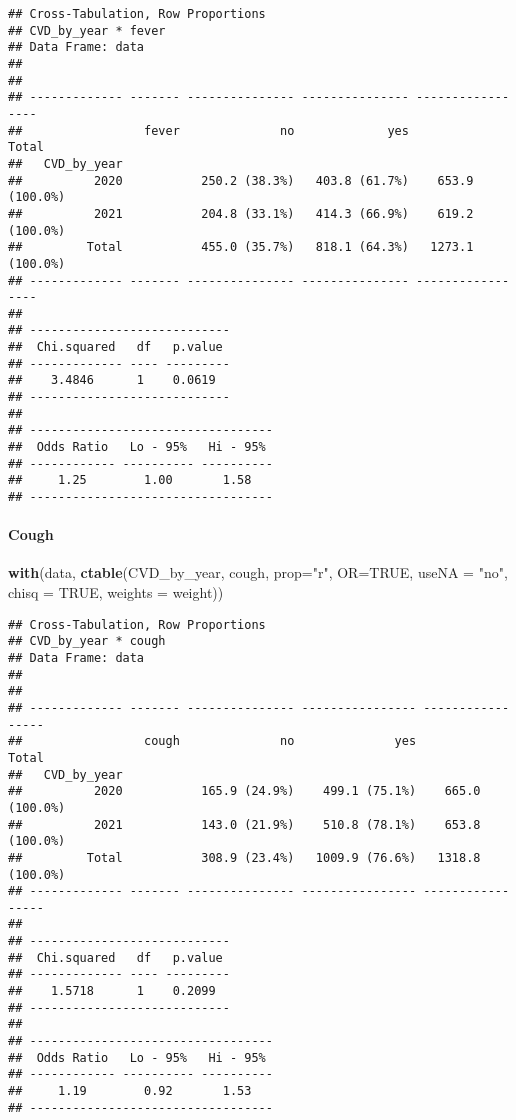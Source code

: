 \documentclass[
]{article}
\newenvironment{Shaded}{\begin{snugshade}}{\end{snugshade}}
\newcommand{\AttributeTok}[1]{\textcolor[rgb]{0.13,0.29,0.53}{#1}}
\newcommand{\ConstantTok}[1]{\textcolor[rgb]{0.56,0.35,0.01}{#1}}
\newcommand{\FunctionTok}[1]{\textcolor[rgb]{0.13,0.29,0.53}{\textbf{#1}}}
\newcommand{\NormalTok}[1]{#1}
\newcommand{\StringTok}[1]{\textcolor[rgb]{0.31,0.60,0.02}{#1}}
\begin{document}
\begin{verbatim}
## Cross-Tabulation, Row Proportions  
## CVD_by_year * fever  
## Data Frame: data  
## 
## 
## ------------- ------- --------------- --------------- -----------------
##                 fever              no             yes             Total
##   CVD_by_year                                                          
##          2020           250.2 (38.3%)   403.8 (61.7%)    653.9 (100.0%)
##          2021           204.8 (33.1%)   414.3 (66.9%)    619.2 (100.0%)
##         Total           455.0 (35.7%)   818.1 (64.3%)   1273.1 (100.0%)
## ------------- ------- --------------- --------------- -----------------
## 
## ----------------------------
##  Chi.squared   df   p.value 
## ------------- ---- ---------
##    3.4846      1    0.0619  
## ----------------------------
## 
## ----------------------------------
##  Odds Ratio   Lo - 95%   Hi - 95% 
## ------------ ---------- ----------
##     1.25        1.00       1.58   
## ----------------------------------
\end{verbatim}

\hypertarget{cough-1}{%
\paragraph{\texorpdfstring{{ Cough }}{ Cough }}\label{cough-1}}

\begin{Shaded}
\begin{Highlighting}[]
\FunctionTok{with}\NormalTok{(data, }\FunctionTok{ctable}\NormalTok{(CVD\_by\_year, cough, }\AttributeTok{prop=}\StringTok{"r"}\NormalTok{, }\AttributeTok{OR=}\ConstantTok{TRUE}\NormalTok{, }\AttributeTok{useNA =} \StringTok{"no"}\NormalTok{, }\AttributeTok{chisq =} \ConstantTok{TRUE}\NormalTok{, }\AttributeTok{weights =}\NormalTok{ weight))}
\end{Highlighting}
\end{Shaded}

\begin{verbatim}
## Cross-Tabulation, Row Proportions  
## CVD_by_year * cough  
## Data Frame: data  
## 
## 
## ------------- ------- --------------- ---------------- -----------------
##                 cough              no              yes             Total
##   CVD_by_year                                                           
##          2020           165.9 (24.9%)    499.1 (75.1%)    665.0 (100.0%)
##          2021           143.0 (21.9%)    510.8 (78.1%)    653.8 (100.0%)
##         Total           308.9 (23.4%)   1009.9 (76.6%)   1318.8 (100.0%)
## ------------- ------- --------------- ---------------- -----------------
## 
## ----------------------------
##  Chi.squared   df   p.value 
## ------------- ---- ---------
##    1.5718      1    0.2099  
## ----------------------------
## 
## ----------------------------------
##  Odds Ratio   Lo - 95%   Hi - 95% 
## ------------ ---------- ----------
##     1.19        0.92       1.53   
## ----------------------------------
\end{verbatim}
\end{document}
